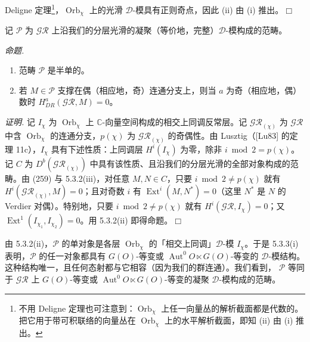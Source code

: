 
Deligne 定理\footnote{不用 Deligne 定理也可注意到：$\operatorname{Orb}_\chi$ 上任一向量丛的解析截面都是代数的。把它用于带可积联络的向量丛在 $\operatorname{Orb}_\chi$ 上的水平解析截面，即知 (ii) 由 (i) 推出。}，$\operatorname{Orb}_\chi$ 上的光滑 $\mathcal{D}$-模具有正则奇点，因此 (ii) 由 (i) 推出。\hfill$\Box$

记 $\mathcal{P}$ 为 $\mathcal{GR}$ 上沿我们的分层光滑的凝聚（等价地，完整）$\mathcal{D}$-模构成的范畴。

 \emph{命题.}

\begin{enumerate}[label=(\roman*),leftmargin=2.2em]
\item 范畴 $\mathcal{P}$ 是半单的。
\item 若 $M\in\mathcal{P}$ 支撑在偶（相应地，奇）连通分支上，则当 $a$ 为奇（相应地，偶）数时 $H^{a}_{DR}(\mathcal{GR},M)=0$。
\end{enumerate}

\emph{证明.} 记 $I_\chi$ 为 $\operatorname{Orb}_\chi$ 上 $\mathbb{C}$-向量空间构成的相交上同调反常层。记 $\mathcal{GR}_{(\chi)}$ 为 $\mathcal{GR}$ 中含 $\operatorname{Orb}_\chi$ 的连通分支，$p(\chi)$ 为 $\mathcal{GR}_{(\chi)}$ 的奇偶性。由 Lusztig（[Lu83] 的定理 11c），$I_\chi$ 具有下述性质：上同调层 $H^{i}(I_\chi)$ 为零，除非 $i\bmod 2=p(\chi)$。记 $C$ 为 $D^{b}(\mathcal{GR}_{(\chi)})$ 中具有该性质、且沿我们的分层光滑的全部对象构成的范畴。由 (259) 与 5.3.2(iii)，对任意 $M,N\in C$，只要 $i\bmod 2\neq p(\chi)$ 就有 $H^{i}(\mathcal{GR}_{(\chi)},M)=0$；且对奇数 $i$ 有 $\operatorname{Ext}^{i}(M,N^{*})=0$（这里 $N^{*}$ 是 $N$ 的 Verdier 对偶）。特别地，只要 $i\bmod 2\neq p(\chi)$ 就有 $H^{i}(\mathcal{GR},I_\chi)=0$；又 $\operatorname{Ext}^{1}(I_{\chi_1},I_{\chi_2})=0$。用 5.3.2(ii) 即得命题。\hfill$\Box$

 由 5.3.2(ii)，$\mathcal{P}$ 的单对象是各层 $\operatorname{Orb}_\chi$ 的「相交上同调」$\mathcal{D}$-模 $I_\chi$。于是 5.3.3(i) 表明，$\mathcal{P}$ 的任一对象都具有 $G(O)$-等变或 $\operatorname{Aut}^{0}O\ltimes G(O)$-等变的 $\mathcal{D}$-模结构。这种结构唯一，且任何态射都与它相容（因为我们的群连通）。我们看到，
$\mathcal{P}$ 等同于 $\mathcal{GR}$ 上 $G(O)$-等变或 $\operatorname{Aut}^{0}O\ltimes G(O)$-等变的凝聚 $\mathcal{D}$-模构成的范畴。

